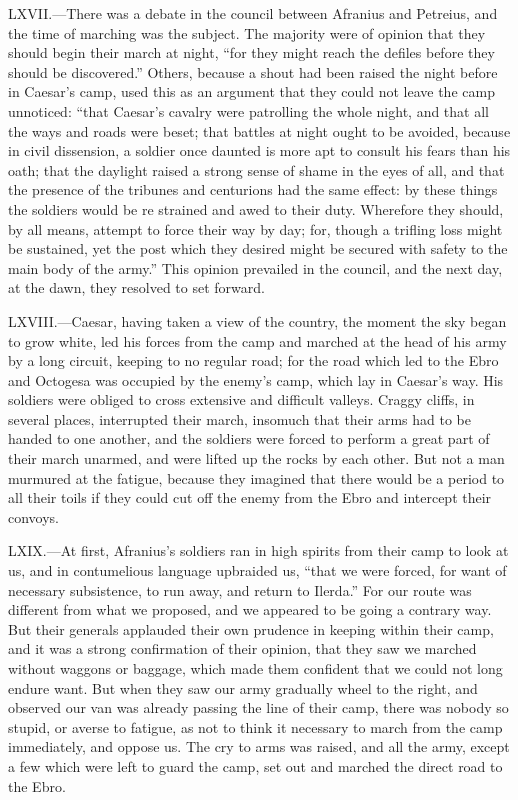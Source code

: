 LXVII.—There was a debate in the council between Afranius and Petreius,
and the time of marching was the subject. The majority were of opinion
that they should begin their march at night, ``for they might reach the
defiles before they should be discovered.'' Others, because a shout had
been raised the night before in Caesar's camp, used this as an argument
that they could not leave the camp unnoticed: ``that Caesar's cavalry
were patrolling the whole night, and that all the ways and roads were
beset; that battles at night ought to be avoided, because in civil
dissension, a soldier once daunted is more apt to consult his fears than
his oath; that the daylight raised a strong sense of shame in the eyes
of all, and that the presence of the tribunes and centurions had the
same effect: by these things the soldiers would be re strained and awed
to their duty. Wherefore they should, by all means, attempt to force
their way by day; for, though a trifling loss might be sustained, yet
the post which they desired might be secured with safety to the main
body of the army.'' This opinion prevailed in the council, and the next
day, at the dawn, they resolved to set forward.

LXVIII.—Caesar, having taken a view of the country, the moment the sky
began to grow white, led his forces from the camp and marched at the
head of his army by a long circuit, keeping to no regular road; for the
road which led to the Ebro and Octogesa was occupied by the enemy's
camp, which lay in Caesar's way. His soldiers were obliged to cross
extensive and difficult valleys. Craggy cliffs, in several places,
interrupted their march, insomuch that their arms had to be handed to
one another, and the soldiers were forced to perform a great part of
their march unarmed, and were lifted up the rocks by each other. But not
a man murmured at the fatigue, because they imagined that there would be
a period to all their toils if they could cut off the enemy from the
Ebro and intercept their convoys.

LXIX.—At first, Afranius's soldiers ran in high spirits from their camp
to look at us, and in contumelious language upbraided us, ``that we were
forced, for want of necessary subsistence, to run away, and return to
Ilerda.'' For our route was different from what we proposed, and we
appeared to be going a contrary way. But their generals applauded their
own prudence in keeping within their camp, and it was a strong
confirmation of their opinion, that they saw we marched without waggons
or baggage, which made them confident that we could not long endure
want. But when they saw our army gradually wheel to the right, and
observed our van was already passing the line of their camp, there was
nobody so stupid, or averse to fatigue, as not to think it necessary to
march from the camp immediately, and oppose us. The cry to arms was
raised, and all the army, except a few which were left to guard the
camp, set out and marched the direct road to the Ebro.

